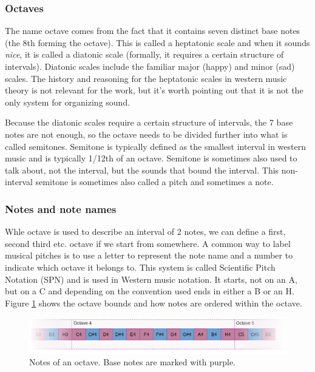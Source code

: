 \subsubsection{Octaves}
The name octave comes from the fact that it contains seven distinct base notes (the 8th forming the octave). This is called a heptatonic scale and when it sounds \textit{nice}, it is called a diatonic scale (formally, it requires a certain structure of intervals). Diatonic scales include the familiar major (happy) and minor (sad) scales. The history and reasoning for the heptatonic scales in western music theory is not relevant for the work, but it's worth pointing out that it is not the only system for organizing sound. 

Because the diatonic scales require a certain structure of intervals, the 7 base notes are not enough, so the octave needs to be divided further into what is called semitones. Semitone is typically defined as the smallest interval in western music and is typically 1/12th of an octave. Semitone is sometimes also used to talk about, not the interval, but the sounds that bound the interval. This non-interval semitone is sometimes also called a pitch and sometimes a note.

\subsubsection{Notes and note names}
Whle octave is used to describe an interval of 2 notes, we can define a first, second third etc. octave if we start from somewhere. A common way to label musical pitches is to use a letter to represent the note name and a number to indicate which octave it belongs to. This system is called Scientific Pitch Notation (SPN) and is used in Western music notation. It starts, not on an A, but on a C and depending on the convention used ends in either a B or an H. Figure \ref{fig:noteScale} shows the octave bounds and how notes are ordered within the octave.

\begin{figure}[ht]
    \centering
    \includegraphics[width=\textwidth]{./images/noteScale.png}
    \caption{Notes of an octave. Base notes are marked with purple. \label{fig:noteScale}}
\end{figure}

